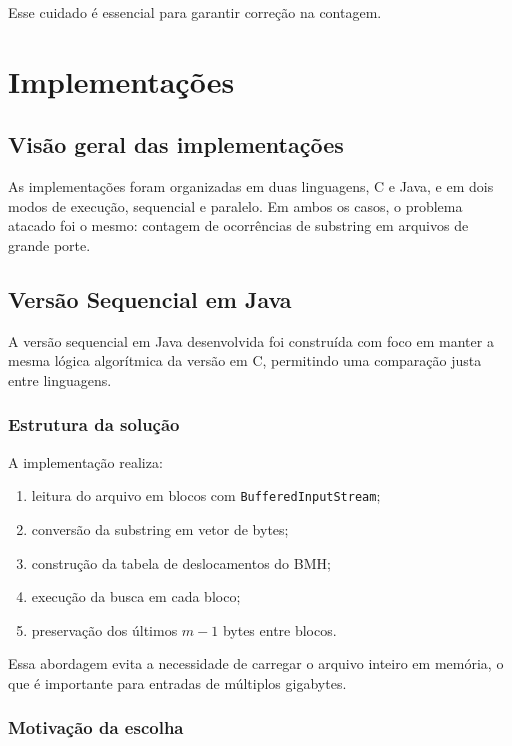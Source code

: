 \documentclass[10pt,twocolumn,a4paper]{article}
\begin{document}
Esse cuidado é essencial para garantir correção na contagem.


\section{Implementações}
\subsection{Visão geral das implementações}

As implementações foram organizadas em duas linguagens, C e Java, e em dois modos de execução, sequencial e paralelo. Em ambos os casos, o problema atacado foi o mesmo: contagem de ocorrências de substring em arquivos de grande porte.

\subsection{Versão Sequencial em Java}

A versão sequencial em Java desenvolvida foi construída com foco em manter a mesma lógica algorítmica da versão em C, permitindo uma comparação justa entre linguagens.

\subsubsection{Estrutura da solução}

A implementação realiza:

\begin{enumerate}[leftmargin=*]
    \item leitura do arquivo em blocos com \texttt{BufferedInputStream};
    \item conversão da substring em vetor de bytes;
    \item construção da tabela de deslocamentos do BMH;
    \item execução da busca em cada bloco;
    \item preservação dos últimos $m-1$ bytes entre blocos.
\end{enumerate}

Essa abordagem evita a necessidade de carregar o arquivo inteiro em memória, o que é importante para entradas de múltiplos gigabytes.

\subsubsection{Motivação da escolha}
\end{document}
